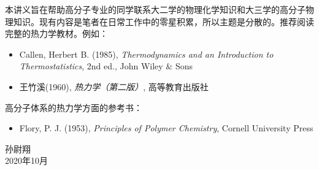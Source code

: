 \documentclass[main.tex]{subfiles}
\begin{document}
本讲义旨在帮助高分子专业的同学联系大二学的物理化学知识和大三学的高分子物理知识。现有内容是笔者在日常工作中的零星积累，所以主题是分散的。推荐阅读完整的热力学教材。例如：
\begin{itemize}
\item Callen, Herbert B. (1985), \emph{Thermodynamics and an Introduction to Thermostatistics}, 2nd ed., John Wiley \& Sons
\item 王竹溪(1960), \emph{热力学（第二版）}, 高等教育出版社
\end{itemize}
高分子体系的热力学方面的参考书：
\begin{itemize}
\item Flory, P. J. (1953), \emph{Principles of Polymer Chemistry}, Cornell University Press
\end{itemize}

\begin{flushright}
孙尉翔\\
2020年10月
\end{flushright}
\end{document}
